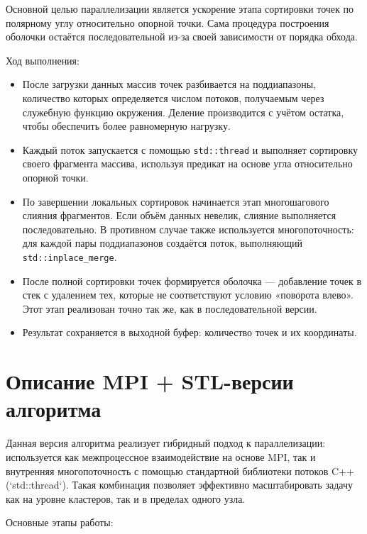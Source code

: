 \documentclass[12pt,a4paper]{extarticle}
\begin{document}
Основной целью параллелизации является ускорение этапа сортировки точек по полярному углу относительно опорной точки. Сама процедура построения оболочки остаётся последовательной из-за своей зависимости от порядка обхода.

Ход выполнения:

\begin{itemize}
    \item После загрузки данных массив точек разбивается на поддиапазоны, количество которых определяется числом потоков, получаемым через служебную функцию окружения. Деление производится с учётом остатка, чтобы обеспечить более равномерную нагрузку.
    
    \item Каждый поток запускается с помощью \texttt{std::thread} и выполняет сортировку своего фрагмента массива, используя предикат на основе угла относительно опорной точки.

    \item По завершении локальных сортировок начинается этап многошагового слияния фрагментов. Если объём данных невелик, слияние выполняется последовательно. В противном случае также используется многопоточность: для каждой пары поддиапазонов создаётся поток, выполняющий \texttt{std::inplace\_merge}.

    \item После полной сортировки точек формируется оболочка — добавление точек в стек с удалением тех, которые не соответствуют условию «поворота влево». Этот этап реализован точно так же, как в последовательной версии.

    \item Результат сохраняется в выходной буфер: количество точек и их координаты.
\end{itemize}

\section{Описание MPI + STL-версии алгоритма}

Данная версия алгоритма реализует гибридный подход к параллелизации: используется как межпроцессное взаимодействие на основе MPI, так и внутренняя многопоточность с помощью стандартной библиотеки потоков C++ (`std::thread`). Такая комбинация позволяет эффективно масштабировать задачу как на уровне кластеров, так и в пределах одного узла.

Основные этапы работы:
\end{document}
